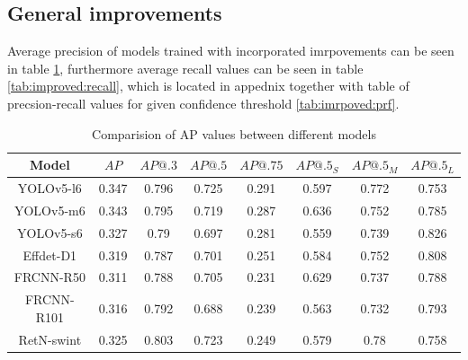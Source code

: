 \subsection{General improvements}
Average precision of models trained with incorporated imrpovements can be seen in table \ref{tab:improved:precision}, furthermore average recall values can be seen in table \ref{tab:improved:recall}, which is located in appednix together with table of precsion-recall values for given confidence threshold \ref{tab:imrpoved:prf}.
\begin{table}[H]
    \centering
    \begin{tabular}{|c|c|c|c|c|c|c|c|}
        \hline
        Model      & $AP$  & $AP@.3$ & $AP@.5$ & $AP@.75$ & $AP@.5_S$ & $AP@.5_M$ & $AP@.5_L$ \\ \hline
        YOLOv5-l6  & 0.347 & 0.796   & 0.725   & 0.291    & 0.597     & 0.772     & 0.753     \\ \hline
        YOLOv5-m6  & 0.343 & 0.795   & 0.719   & 0.287    & 0.636     & 0.752     & 0.785     \\ \hline
        YOLOv5-s6  & 0.327 & 0.79    & 0.697   & 0.281    & 0.559     & 0.739     & 0.826     \\ \hline
        Effdet-D1  & 0.319 & 0.787   & 0.701   & 0.251    & 0.584     & 0.752     & 0.808     \\ \hline
        FRCNN-R50  & 0.311 & 0.788   & 0.705   & 0.231    & 0.629     & 0.737     & 0.788     \\ \hline
        FRCNN-R101 & 0.316 & 0.792   & 0.688   & 0.239    & 0.563     & 0.732     & 0.793     \\ \hline
        RetN-swint & 0.325 & 0.803   & 0.723   & 0.249    & 0.579     & 0.78      & 0.758     \\ \hline
    \end{tabular}
    \caption{Comparision of AP values between different models}
    \label{tab:improved:precision}
\end{table}



